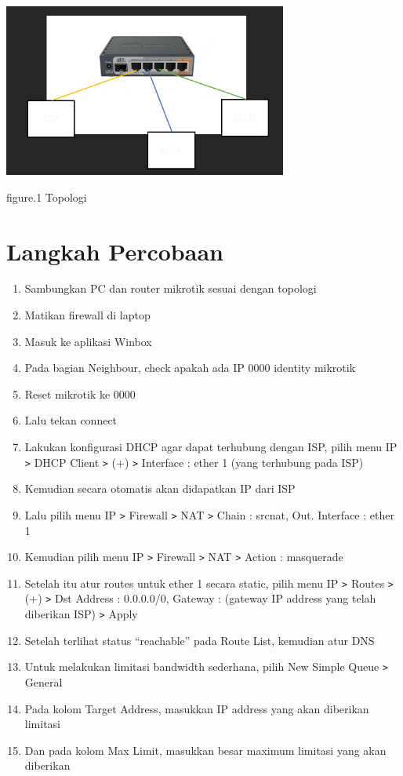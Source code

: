 \begin{center}
    \includegraphics[width=0.7\textwidth]{image/P3/Topologi.png}    
    
    figure.1 Topologi
\end{center}


\section{Langkah Percobaan}
\begin{enumerate}
    \item Sambungkan PC dan router mikrotik sesuai dengan topologi
    \item Matikan firewall di laptop
    \item Masuk ke aplikasi Winbox
    \item Pada bagian Neighbour, check apakah ada IP 0000 identity mikrotik
    \item Reset mikrotik ke 0000
    \item Lalu tekan connect
    \item Lakukan konfigurasi DHCP agar dapat terhubung dengan ISP, pilih menu IP \texttt{\text>} DHCP Client \texttt{\text>} (+) \texttt{\text>} Interface : ether 1 (yang terhubung pada ISP)
    \item Kemudian secara otomatis akan didapatkan IP dari ISP
    \item Lalu pilih menu IP \texttt{\text>} Firewall \texttt{\text>} NAT \texttt{\text>} Chain : srcnat, Out. Interface : ether 1
    \item Kemudian pilih menu IP \texttt{\text>} Firewall \texttt{\text>} NAT \texttt{\text>} Action : masquerade
    \item Setelah itu atur routes untuk ether 1 secara static, pilih menu IP \texttt{\text>} Routes \texttt{\text>} (+) \texttt{\text>} Dst Address : 0.0.0.0/0, Gateway : (gateway IP address yang telah diberikan ISP) \texttt{\text>} Apply
    \item Setelah terlihat status “reachable” pada Route List, kemudian atur DNS
    \item Untuk melakukan limitasi bandwidth sederhana, pilih New Simple Queue \texttt{\text>} General
    \item Pada kolom Target Address, masukkan IP address yang akan diberikan limitasi
    \item Dan pada kolom Max Limit, masukkan besar maximum limitasi yang akan diberikan
    
\end{enumerate}

